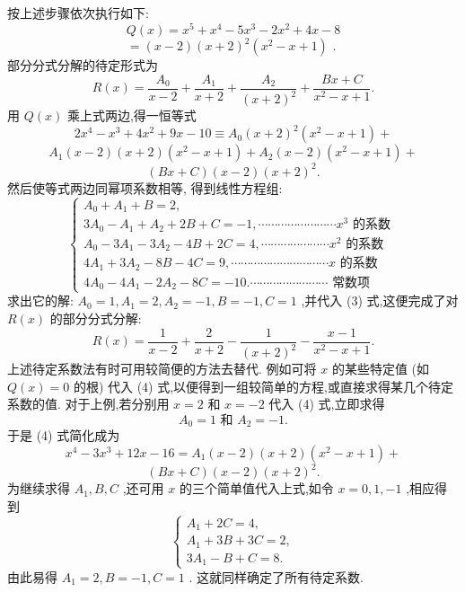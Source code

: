 \begin{solution}

\end{solution}
按上述步骤依次执行如下:
\[
Q\left( x\right)  = {x}^{5} + {x}^{4} - 5{x}^{3} - 2{x}^{2} + {4x} - 8
\]
\[
= \left( {x - 2}\right) {\left( x + 2\right) }^{2}\left( {{x}^{2} - x + 1}\right) \text{ . }
\]
部分分式分解的待定形式为
\[
R\left( x\right)  = \frac{{A}_{0}}{x - 2} + \frac{{A}_{1}}{x + 2} + \frac{{A}_{2}}{{\left( x + 2\right) }^{2}} + \frac{{Bx} + C}{{x}^{2} - x + 1}. \tag{3}
\]
用 \(Q\left( x\right)\) 乘上式两边,得一恒等式
\[
2{x}^{4} - {x}^{3} + 4{x}^{2} + {9x} - {10} \equiv  {A}_{0}{\left( x + 2\right) }^{2}\left( {{x}^{2} - x + 1}\right)  +
\]
\[
{A}_{1}\left( {x - 2}\right) \left( {x + 2}\right) \left( {{x}^{2} - x + 1}\right)  + {A}_{2}\left( {x - 2}\right) \left( {{x}^{2} - x + 1}\right)  +
\]
\[
\left( {{Bx} + C}\right) \left( {x - 2}\right) {\left( x + 2\right) }^{2}. \tag{4}
\]
然后使等式两边同幂项系数相等, 得到线性方程组:
\[
\left\{  \begin{array}{l} {A}_{0} + {A}_{1} + B = 2, \\  3{A}_{0} - {A}_{1} + {A}_{2} + {2B} + C =  - 1,\cdots \cdots \cdots \cdots \cdots \cdots \cdots \cdots {x}^{3}\text{ 的系数 } \\  {A}_{0} - 3{A}_{1} - 3{A}_{2} - {4B} + {2C} = 4,\cdots \cdots \cdots \cdots \cdots \cdots \cdots {x}^{2}\text{ 的系数 } \\  4{A}_{1} + 3{A}_{2} - {8B} - {4C} = 9,\cdots \cdots \cdots \cdots \cdots \cdots \cdots \cdots \cdots \cdots x\text{ 的系数 } \\  4{A}_{0} - 4{A}_{1} - 2{A}_{2} - {8C} =  - {10}.\cdots \cdots \cdots \cdots \cdots \cdots \cdots \cdots \text{ 常数项 } \end{array}\right.
\]
求出它的解: \({A}_{0} = 1,{A}_{1} = 2,{A}_{2} =  - 1,B =  - 1,C = 1\) ,并代入 (3) 式,这便完成了对 \(R\left( x\right)\) 的部分分式分解:
\[
R\left( x\right)  = \frac{1}{x - 2} + \frac{2}{x + 2} - \frac{1}{{\left( x + 2\right) }^{2}} - \frac{x - 1}{{x}^{2} - x + 1}.
\]
上述待定系数法有时可用较简便的方法去替代. 例如可将 \(x\) 的某些特定值 (如 \(Q\left( x\right)  = 0\) 的根) 代入 (4) 式,以便得到一组较简单的方程,或直接求得某几个待定系数的值. 对于上例,若分别用 \(x = 2\) 和 \(x =  - 2\) 代入 (4) 式,立即求得
\[
{A}_{0} = 1\text{ 和 }{A}_{2} =  - 1.
\]
于是 (4) 式简化成为
\[
{x}^{4} - 3{x}^{3} + {12x} - {16} = {A}_{1}\left( {x - 2}\right) \left( {x + 2}\right) \left( {{x}^{2} - x + 1}\right)  +
\]
\[
\left( {{Bx} + C}\right) \left( {x - 2}\right) {\left( x + 2\right) }^{2}.
\]
为继续求得 \({A}_{1},B,C\) ,还可用 \(x\) 的三个简单值代入上式,如令 \(x = 0,1, - 1\) ,相应得到
\[
\left\{  \begin{array}{l} {A}_{1} + {2C} = 4, \\  {A}_{1} + {3B} + {3C} = 2, \\  3{A}_{1} - B + C = 8. \end{array}\right.
\]
由此易得 \({A}_{1} = 2,B =  - 1,C = 1\) . 这就同样确定了所有待定系数.

